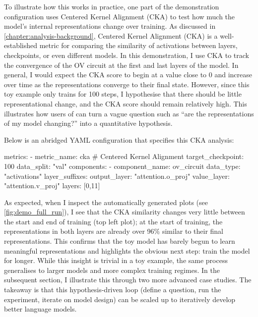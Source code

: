 To illustrate how this works in practice, one part of the demonstration configuration uses Centered Kernel Alignment (CKA) to test how much the model's internal representations change over training. As discussed in \cref{chapter:analysis-background}, Centered Kernel Alignment (CKA) is a well-established metric for comparing the similarity of activations between layers, checkpoints, or even different models. In this demonstration, I use CKA to track the convergence of the OV circuit at the first and last layers of the model. In general, I would expect the CKA score to begin at a value close to 0 and increase over time as the representations converge to their final state. However, since this toy example only trains for 100 steps, I hypothesise that there should be little representational change, and the CKA score should remain relatively high. This illustrates how users of \pico can turn a vague question such as “are the representations of my model changing?” into a quantitative hypothesis.

Below is an abridged YAML configuration that specifies this CKA analysis:

\begin{center}
\begin{configlisting}
    metrics:
    - metric_name: cka # Centered Kernel Alignment
      target_checkpoint: 100
      data_split: "val"
      components: 
        - component_name: ov_circuit
          data_type: "activations"
          layer_suffixes: 
            output_layer: "attention.o_proj"
            value_layer: "attention.v_proj"
          layers: [0,11]

\end{configlisting}
\end{center}

As expected, when I inspect the automatically generated plots (see \cref{fig:demo_full_run}), I see that the CKA similarity changes very little between the start and end of training (top left plot); at the start of training, the representations in both layers are already over 96\% similar to their final representations. This confirms that the toy model has barely begun to learn meaningful representations and highlights the obvious next step: train the model for longer. While this insight is trivial in a toy example, the same process generalises to larger models and more complex training regimes. In the subsequent section, I illustrate this through two more advanced case studies. The takeaway is that this hypothesis-driven loop (define a question, run the experiment, iterate on model design) can be scaled up to iteratively develop better language models.

